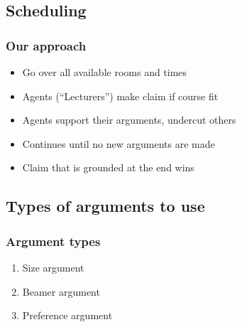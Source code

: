 \documentclass{beamer}
\begin{document}
\subsection{Scheduling}
\begin{frame}
	\frametitle{Our approach}
        \begin{itemize}
            \item Go over all available rooms and times
            \item Agents (``Lecturers'') make claim if course fit
            \item Agents support their arguments, undercut others
            \item Continues until no new arguments are made
            \item Claim that is grounded at the end wins
        \end{itemize}
\end{frame}

\subsection{Types of arguments to use}
\begin{frame}
	\frametitle{Argument types}
	\begin{enumerate}
		\item Size argument 
		\item Beamer argument
		\item Preference argument
	\end{enumerate}
\end{frame}
\end{document}
